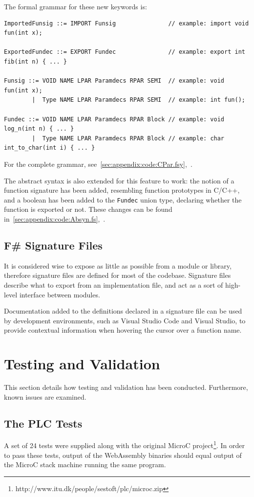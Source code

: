 \documentclass[a4paper]{article}
\begin{document}
The formal grammar for these new keywords is:
\begin{verbatim}
ImportedFunsig ::= IMPORT Funsig               // example: import void fun(int x);

ExportedFundec ::= EXPORT Fundec               // example: export int fib(int n) { ... }

Funsig ::= VOID NAME LPAR Paramdecs RPAR SEMI  // example: void fun(int x);
        |  Type NAME LPAR Paramdecs RPAR SEMI  // example: int fun();
        
Fundec ::= VOID NAME LPAR Paramdecs RPAR Block // example: void log_n(int n) { ... }
        |  Type NAME LPAR Paramdecs RPAR Block // example: char int_to_char(int i) { ... }
\end{verbatim}

For the complete grammar, see~\ref{sec:appendix:code:CPar.fsy},~.

The abstract syntax is also extended for this feature to work: the notion of a function signature has been added, resembling function prototypes in C/C++, and a boolean has been added to the \texttt{Fundec} union type, declaring whether the function is exported or not. These changes can be found in~\ref{sec:appendix:code:Absyn.fs},~.

\subsection{F\# Signature Files}
It is considered wise to expose as little as possible from a module or library, therefore signature files are defined for most of the codebase. Signature files describe what to export from an implementation file, and act as a sort of high-level interface between modules.

Documentation added to the definitions declared in a signature file can be used by development environments, such as Visual Studio Code and Visual Studio, to provide contextual information when hovering the cursor over a function name.

\newpage
\section{Testing and Validation}
\label{sec:testing}
This section details how testing and validation has been conducted. Furthermore, known issues are examined.

\subsection{The PLC Tests}
\label{sec:testing:plc}
A set of 24 tests were supplied along with the original MicroC project\footnote{http://www.itu.dk/people/sestoft/plc/microc.zip}. In order to pass these tests, output of the WebAssembly binaries should equal output of the MicroC stack machine running the same program.
\end{document}

